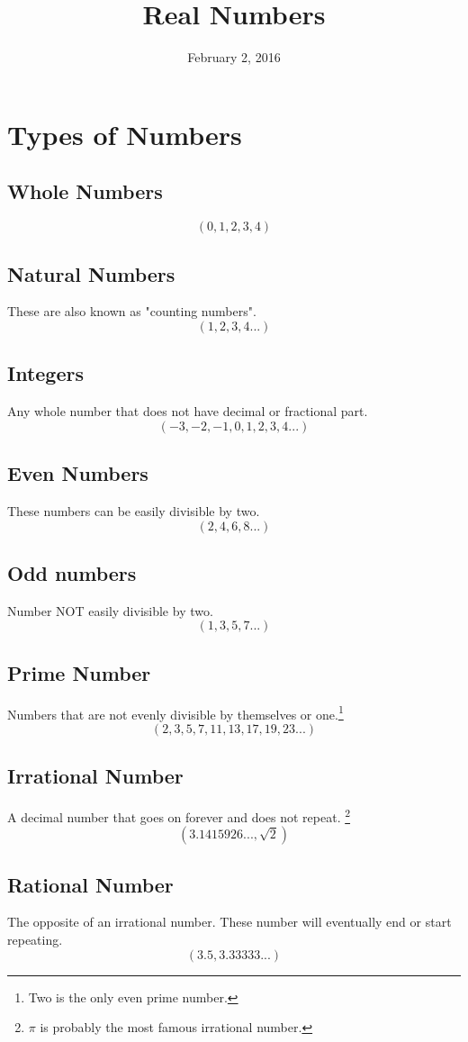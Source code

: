 \documentclass[]{article}
\title{Real Numbers}
\date{February 2, 2016}
\author{}
\begin{document}
\maketitle

\tableofcontents
\pagebreak

\section{Types of Numbers}
\subsection{Whole Numbers}
$$ (0,1,2,3,4)$$
\subsection{Natural Numbers}
These are also known as "counting numbers". $$(1,2,3,4...)$$
\subsection{Integers}
Any whole number that does not have decimal or fractional part.
$$(-3,-2,-1,0,1,2,3,4...)$$
\subsection{Even Numbers}
These numbers can be easily divisible by two.
$$(2,4,6,8...)$$
\subsection{Odd numbers}
Number NOT easily divisible by two.
$$(1,3,5,7...)$$
\subsection{Prime Number}
Numbers that are not evenly divisible by themselves or one.\footnote{Two is the only even prime number.}
$$(2,3,5,7,11,13,17,19,23...)$$
\subsection{Irrational Number}
A decimal number that goes on forever and does not repeat. \footnote{$\pi$ is probably the most famous irrational number.}
$$(3.1415926..., \sqrt 2)$$
\subsection{Rational Number}
The opposite of an irrational number. These number will eventually end or start repeating.
$$(3.5,3.33333...)$$
\end{document}
